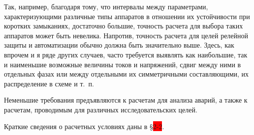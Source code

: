 Так, например, благодаря тому, что интервалы между параметрами, характеризующими различные типы аппаратов в отношении их устойчивости при коротких замыканиях, достаточно большие, точность расчета для выбора таких аппаратов может быть невелика. Напротив, точность расчета для целей релейной защиты и автоматизации обычно должна быть значительно выше. Здесь, как впрочем и я ряде других случаев, часто требуется выявлять как наибольшие, так и наименьшие возможные величины токов и напряжений, сдвиг между ними в отдельных фазах или между отдельными их симметричными составляющими, их распределение в схеме и т.~п.

Неменьшие требования предъявляются к расчетам для анализа аварий, а также к расчетам, проводимым для различных исследовательских целей.

Краткие сведения о расчетных условиях даны в §\colorbox{red}{2-2}.



















